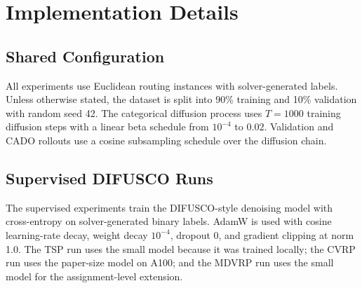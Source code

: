\chapter{Implementation Details}
\label{app:implementation}

\section{Shared Configuration}
\label{app:configs}

All experiments use Euclidean routing instances with solver-generated labels. Unless otherwise
stated, the dataset is split into 90\% training and 10\% validation with random seed 42. The
categorical diffusion process uses \(T=1000\) training diffusion steps with a linear beta
schedule from \(10^{-4}\) to \(0.02\). Validation and CADO rollouts use a cosine subsampling
schedule over the diffusion chain.

\begin{table}[htbp]
\centering
\caption{Shared data and diffusion settings.}
\label{tab:app-shared-config}
\end{table}

\section{Supervised DIFUSCO Runs}
\label{app:sl-configs}

The supervised experiments train the DIFUSCO-style denoising model with cross-entropy on
solver-generated binary labels. AdamW is used with cosine learning-rate decay, weight decay
\(10^{-4}\), dropout 0, and gradient clipping at norm 1.0. The TSP run uses the small model
because it was trained locally; the CVRP run uses the paper-size model on A100; and the MDVRP
run uses the small model for the assignment-level extension.


